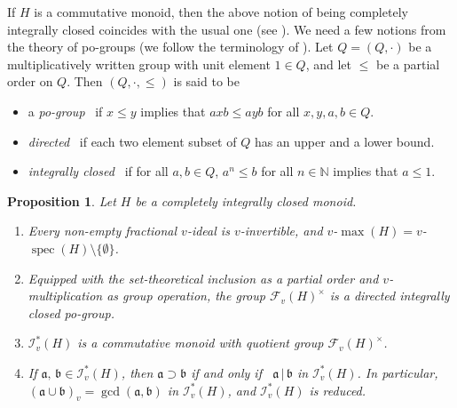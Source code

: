 \documentclass[a4paper]{amsart}
\newtheorem{proposition}[theorem]{Proposition}
\theoremstyle{definition}
\numberwithin{equation}{section}
\begin{document}
\smallskip
If $H$ is a commutative monoid, then the above notion of being
completely integrally closed coincides with the usual one (see
\cite[Section 2.3]{Ge-HK06a}). We need a few notions from the theory
of  po-groups (we follow the terminology of \cite{St10a}).
Let $Q = (Q, \cdot)$ be a multiplicatively written group with unit
element $1 \in Q$, and let $\le$ be a partial order on $Q$.  Then
$(Q, \cdot, \le)$ is said to be
\begin{itemize}
\item a {\it po-group} \ if $x \le y$ implies that $axb \le ayb$ for
      all $x,y,a,b \in Q$.

\item {\it directed} \ if each two element subset of $Q$ has an upper and a lower bound.

\item {\it integrally closed} \ if for all $a, b \in Q$, $a^n \le b$
for all $n \in {\mathbb N}$ implies that $a \le 1$.
\end{itemize}

\medskip
\begin{proposition} \label{3.12}
Let $H$ be a completely integrally closed monoid.
\begin{enumerate}
\item Every non-empty fractional $v$-ideal is $v$-invertible, and $v$-$\max (H) = v$-$\operatorname{spec} (H) \setminus \{\emptyset\}$.

\smallskip
\item Equipped with the set-theoretical inclusion as a partial
order and $v$-multiplication as group operation, the group $\mathcal
F_v (H)^{\times}$ is a directed integrally closed po-group.

\smallskip
\item $\mathcal I_v^* (H)$ is a commutative monoid with quotient
      group $\mathcal F_v (H)^{\times}$.

\smallskip
\item
If $\mathfrak a,\, \mathfrak b \in \mathcal I^*_v (H)$, then
$\mathfrak a \supset \mathfrak b$ if and only if \ $\mathfrak a {\, | \,}
\mathfrak b$ in $\mathcal I^*_v(H)$. In particular, $(\mathfrak a
\cup \mathfrak b)_v = \gcd (\mathfrak a , \mathfrak b)$ in $\mathcal
I_v^*(H)$, and $\mathcal I_v^* (H)$ is reduced.
\end{enumerate}
\end{proposition}
\end{document}
